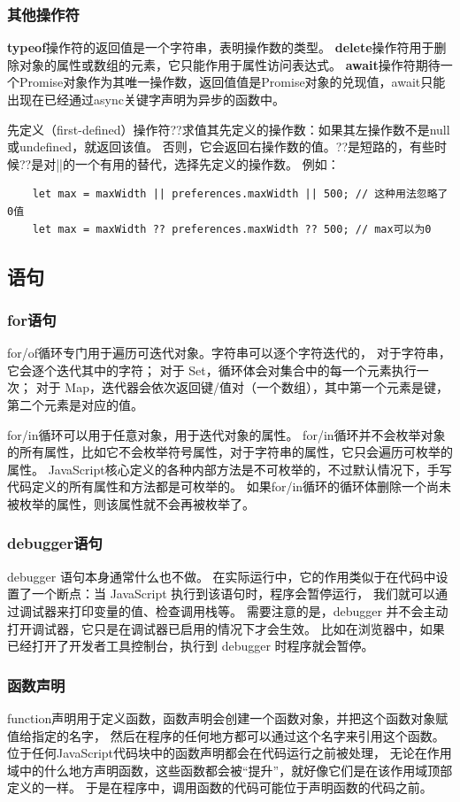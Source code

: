 \subsubsection{其他操作符}
\textbf{typeof}操作符的返回值是一个字符串，表明操作数的类型。
\textbf{delete}操作符用于删除对象的属性或数组的元素，它只能作用于属性访问表达式。
\textbf{await}操作符期待一个Promise对象作为其唯一操作数，返回值值是Promise对象的兑现值，await只能出现在已经通过async关键字声明为异步的函数中。

先定义（first-defined）操作符??求值其先定义的操作数：如果其左操作数不是null或undefined，就返回该值。
否则，它会返回右操作数的值。??是短路的，有些时候??是对||的一个有用的替代，选择先定义的操作数。
例如：
\begin{verbatim}
    let max = maxWidth || preferences.maxWidth || 500; // 这种用法忽略了0值
    let max = maxWidth ?? preferences.maxWidth ?? 500; // max可以为0
\end{verbatim}

\subsection{语句}
\subsubsection{for语句}
for/of循环专门用于遍历可迭代对象。字符串可以逐个字符迭代的，
对于字符串，它会逐个迭代其中的字符；
对于 Set，循环体会对集合中的每一个元素执行一次；
对于 Map，迭代器会依次返回键/值对（一个数组），其中第一个元素是键，第二个元素是对应的值。

for/in循环可以用于任意对象，用于迭代对象的属性。
for/in循环并不会枚举对象的所有属性，比如它不会枚举符号属性，对于字符串的属性，它只会遍历可枚举的属性。
JavaScript核心定义的各种内部方法是不可枚举的，不过默认情况下，手写代码定义的所有属性和方法都是可枚举的。
如果for/in循环的循环体删除一个尚未被枚举的属性，则该属性就不会再被枚举了。

\subsubsection{debugger语句}
debugger 语句本身通常什么也不做。
在实际运行中，它的作用类似于在代码中设置了一个断点：当 JavaScript 执行到该语句时，程序会暂停运行，
我们就可以通过调试器来打印变量的值、检查调用栈等。
需要注意的是，debugger 并不会主动打开调试器，它只是在调试器已启用的情况下才会生效。
比如在浏览器中，如果已经打开了开发者工具控制台，执行到 debugger 时程序就会暂停。

\subsubsection{函数声明}
function声明用于定义函数，函数声明会创建一个函数对象，并把这个函数对象赋值给指定的名字，
然后在程序的任何地方都可以通过这个名字来引用这个函数。位于任何JavaScript代码块中的函数声明都会在代码运行之前被处理，
无论在作用域中的什么地方声明函数，这些函数都会被“提升”，就好像它们是在该作用域顶部定义的一样。
于是在程序中，调用函数的代码可能位于声明函数的代码之前。
